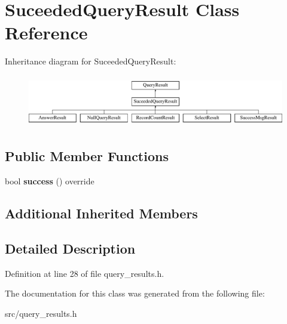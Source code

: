 \hypertarget{class_suceeded_query_result}{}\section{Suceeded\+Query\+Result Class Reference}
\label{class_suceeded_query_result}
Inheritance diagram for Suceeded\+Query\+Result\+:\begin{figure}[H]
\begin{center}
\leavevmode
\includegraphics[height=2.285714cm]{class_suceeded_query_result}
\end{center}
\end{figure}
\subsection*{Public Member Functions}
\begin{DoxyCompactItemize}
\item 
\mbox{\label{class_suceeded_query_result_a9080ba9ec97b32638efab6fa9472de94}} 
bool {\bfseries success} () override
\end{DoxyCompactItemize}
\subsection*{Additional Inherited Members}


\subsection{Detailed Description}


Definition at line 28 of file query\+\_\+results.\+h.



The documentation for this class was generated from the following file\+:\begin{DoxyCompactItemize}
\item 
src/query\+\_\+results.\+h\end{DoxyCompactItemize}
